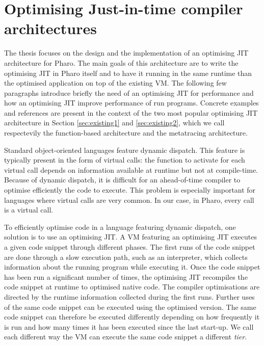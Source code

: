 \documentclass[a4paper,12pt,twoside]{../includes/ThesisStyle}
\begin{document}
\fi

\chapter{Optimising Just-in-time compiler architectures}
\label{chap:stateOfTheArt}
\minitoc

The thesis focuses on the design and the implementation of an optimising JIT architecture for Pharo. The main goals of this architecture are to write the optimising JIT in Pharo itself and to have it running in the same runtime than the optimised application on top of the existing VM. The following few paragraphs introduce briefly the need of an optimising JIT for performance and how an optimising JIT improve performance of run programs. Concrete examples and references are present in the context of the two most popular optimising JIT architecture in Section \ref{sec:existing1} and \ref{sec:existing2}, which we call respectevily the function-based architecture and the metatracing architecture.

Standard object-oriented languages feature dynamic dispatch. This feature is typically present in the form of virtual calls: the function to activate for each virtual call depends on information available at runtime but not at compile-time. Because of dynamic dispatch, it is difficult for an ahead-of-time compiler to optimise efficiently the code to execute. This problem is especially important for languages where virtual calls are very common. In our case, in Pharo, every call is a virtual call.

To efficiently optimise code in a language featuring dynamic dispatch, one solution is to use an optimising JIT. A VM featuring an optimising JIT executes a given code snippet through different phases. The first runs of the code snippet are done through a slow execution path, such as an interpreter, which collects information about the running program while executing it. Once the code snippet has been run a significant number of times, the optimising JIT recompiles the code snippet at runtime to optimised native code. The compiler optimisations are directed by the runtime information collected during the first runs. Further uses of the same code snippet can be executed using the optimised version. The same code snippet can therefore be executed differently depending on how frequently it is run and how many times it has been executed since the last start-up. We call each different way the VM can execute the same code snippet a different \emph{tier}.
\end{document}
